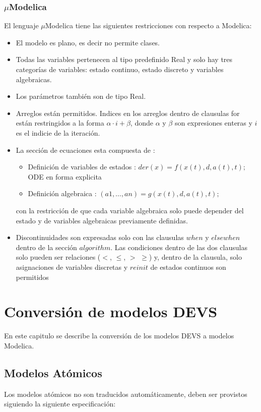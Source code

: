 \documentclass[a4paper,	11pt]{report}
\begin{document}
\subsection{$\mu$Modelica}
El lenguaje $\mu$Modelica tiene las siguientes restricciones con respecto a Modelica:

\begin{itemize}
 \item El modelo es plano, es decir no permite clases.
 \item Todas las variables pertenecen al tipo predefinido Real y solo hay tres categorías de variables: estado continuo, estado discreto y variables algebraicas.
 \item Los parámetros también son de tipo Real. 
 \item Arreglos están permitidos. Indices en los arreglos dentro de clausulas for están restringidos a la forma $\alpha \cdot i + \beta$, donde $\alpha$ y $\beta$ son expresiones enteras y $i$ es el indicie de la iteración.
 \item La sección de ecuaciones esta compuesta de :
 \begin{itemize}
	\item Definición de variables de estados : $der(x) =  f (x(t), d, a(t), t);$ ODE en forma explicita
	\item Definición algebraica : $(a 1 , \dots , a n ) = g(x(t), d, a(t), t);$
 \end{itemize}
 con la restricción de que cada variable algebraica solo puede depender del estado y de variables algebraicas previamente definidas.
 
 \item Discontinuidades son expresadas solo con las clausulas $when$ y $elsewhen$ dentro de la sección $algorithm$. Las condiciones dentro de las dos clausulas solo pueden ser relaciones ($<$, $\leqslant$, $>$ $\geqslant$) y, dentro de la clausula, solo asignaciones de variables discretas y $reinit$ de estados continuos son permitidos
\end{itemize}


\chapter{Conversión de modelos DEVS}

En este capitulo se describe la conversión de los modelos DEVS a modelos Modelica.

\section{Modelos Atómicos}
Los modelos atómicos no son traducidos automáticamente, deben ser provistos siguiendo la siguiente especificación:
\end{document}
